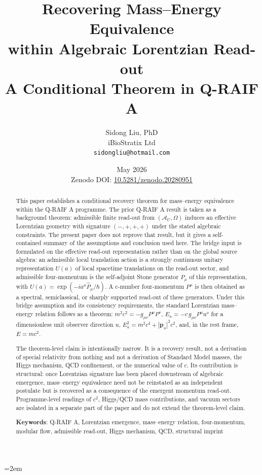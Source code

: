 \documentclass[12pt,a4paper]{article}
\title{%
  \textbf{Recovering Mass--Energy Equivalence}\\
  \textbf{within Algebraic Lorentzian Read-out}\\
  \large A Conditional Theorem in Q-RAIF A%
}
\author{
  Sidong Liu, PhD \\
  \small iBioStratix Ltd \\
  \small \texttt{sidongliu@hotmail.com}
}
\date{May 2026\\
\small Zenodo DOI: \href{https://doi.org/10.5281/zenodo.20280951}{10.5281/zenodo.20280951}}
\theoremstyle{definition}
\theoremstyle{remark}
\newcommand{\AU}{\mathcal{A}_U}
\newcommand{\Omegastate}{\Omega}
\begin{document}
\emergencystretch=2em
\raggedbottom
{}

\maketitle

\begin{abstract}
This paper establishes a conditional recovery theorem for mass--energy equivalence within the Q-RAIF A programme. The prior Q-RAIF A result is taken as a background theorem: admissible finite read-out from $(\AU,\Omegastate)$ induces an effective Lorentzian geometry with signature $(-,+,+,+)$ under the stated algebraic constraints. The present paper does not reprove that result, but it gives a self-contained summary of the assumptions and conclusion used here. The bridge input is formulated on the effective read-out representation rather than on the global source algebra: an admissible local translation action is a strongly continuous unitary representation $U(a)$ of local spacetime translations on the read-out sector, and admissible four-momentum is the self-adjoint Stone generator $\hat P_\mu$ of this representation, with $U(a)=\exp(-i a^\mu\hat P_\mu/\hbar)$. A c-number four-momentum $P^\mu$ is then obtained as a spectral, semiclassical, or sharply supported read-out of these generators. Under this bridge assumption and its consistency requirements, the standard Lorentzian mass--energy relation follows as a theorem: $m^2c^2=-g_{\mu\nu}P^\mu P^\nu$, $E_u=-c\,g_{\mu\nu}P^\mu u^\nu$ for a dimensionless unit observer direction $u$, $E_u^2=m^2c^4+|\mathbf p_u|^2c^2$, and, in the rest frame, $E=mc^2$.

The theorem-level claim is intentionally narrow. It is a recovery result, not a derivation of special relativity from nothing and not a derivation of Standard Model masses, the Higgs mechanism, QCD confinement, or the numerical value of $c$. Its contribution is structural: once Lorentzian signature has been placed downstream of algebraic emergence, mass--energy equivalence need not be reinstated as an independent postulate but is recovered as a consequence of the emergent momentum read-out. Programme-level readings of $c^2$, Higgs/QCD mass contributions, and vacuum sectors are isolated in a separate part of the paper and do not extend the theorem-level claim.

\medskip
\noindent\textbf{Keywords}: Q-RAIF A, Lorentzian emergence, mass--energy relation, four-momentum, modular flow, admissible read-out, Higgs mechanism, QCD, structural imprint
\end{abstract}
\end{document}
